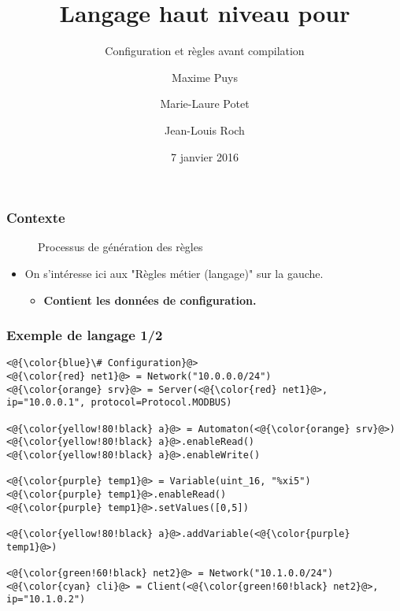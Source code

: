 \documentclass{beamer}
\title{Langage haut niveau pour \ARAMIS{}}
\subtitle{Configuration et règles avant compilation}
\author[Maxime Puys]{Maxime Puys \and Marie-Laure Potet \and Jean-Louis Roch}
\institute{VERIMAG, Univ. Grenoble Alpes}
\date{7 janvier 2016}
\begin{document}
\begin{frame}
    \maketitle
\end{frame}


%

\begin{frame}
    \frametitle{Contexte}

    \begin{figure}[htb]
        \caption{Processus de génération des règles}
    \end{figure}
    \vfill
    \begin{itemize}
        \item On s'intéresse ici aux "Règles métier (langage)" sur la gauche.
        \begin{itemize}
            \item {\bf Contient les données de configuration.}
        \end{itemize}
    \end{itemize}
\end{frame}

\begin{frame}[fragile]
    \frametitle{Exemple de langage 1/2}

    \begin{lstlisting}
<@{\color{blue}\# Configuration}@>
<@{\color{red} net1}@> = Network("10.0.0.0/24")
<@{\color{orange} srv}@> = Server(<@{\color{red} net1}@>, ip="10.0.0.1", protocol=Protocol.MODBUS)

<@{\color{yellow!80!black} a}@> = Automaton(<@{\color{orange} srv}@>)
<@{\color{yellow!80!black} a}@>.enableRead()
<@{\color{yellow!80!black} a}@>.enableWrite()

<@{\color{purple} temp1}@> = Variable(uint_16, "%xi5")
<@{\color{purple} temp1}@>.enableRead()
<@{\color{purple} temp1}@>.setValues([0,5])

<@{\color{yellow!80!black} a}@>.addVariable(<@{\color{purple} temp1}@>)

<@{\color{green!60!black} net2}@> = Network("10.1.0.0/24")
<@{\color{cyan} cli}@> = Client(<@{\color{green!60!black} net2}@>, ip="10.1.0.2")
    \end{lstlisting}
\end{frame}
\end{document}
